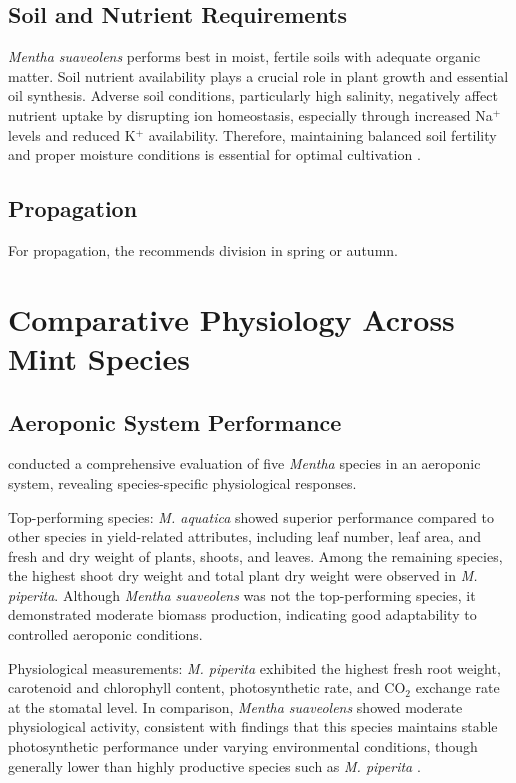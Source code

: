 \subsection*{Soil and Nutrient Requirements}
\textit{Mentha suaveolens} performs best in moist, fertile soils with adequate organic matter. Soil nutrient availability plays a crucial role in plant growth and essential oil synthesis. Adverse soil conditions, particularly high salinity, negatively affect nutrient uptake by disrupting ion homeostasis, especially through increased Na$^+$ levels and reduced K$^+$ availability. Therefore, maintaining balanced soil fertility and proper moisture conditions is essential for optimal cultivation \textcite{Kasrati2014, Magdy2025}.

\subsection*{Propagation}
For propagation, the \textcite{rhs2026crispa} recommends division in spring or autumn.

\section*{Comparative Physiology Across Mint Species}

\subsection*{Aeroponic System Performance}
\textcite{yaghobvand2022evaluation} conducted a comprehensive evaluation of five \textit{Mentha} species in an aeroponic system, revealing species-specific physiological responses.

Top-performing species: \textit{M. aquatica} showed superior performance compared to other species in yield-related attributes, including leaf number, leaf area, and fresh and dry weight of plants, shoots, and leaves. Among the remaining species, the highest shoot dry weight and total plant dry weight were observed in \textit{M. piperita}. Although \textit{Mentha suaveolens} was not the top-performing species, it demonstrated moderate biomass production, indicating good adaptability to controlled aeroponic conditions.

Physiological measurements: \textit{M. piperita} exhibited the highest fresh root weight, carotenoid and chlorophyll content, photosynthetic rate, and CO$_2$ exchange rate at the stomatal level. In comparison, \textit{Mentha suaveolens} showed moderate physiological activity, consistent with findings that this species maintains stable photosynthetic performance under varying environmental conditions, though generally lower than highly productive species such as \textit{M. piperita} \textcite{Kasrati2014, Ahmadi2023}.

